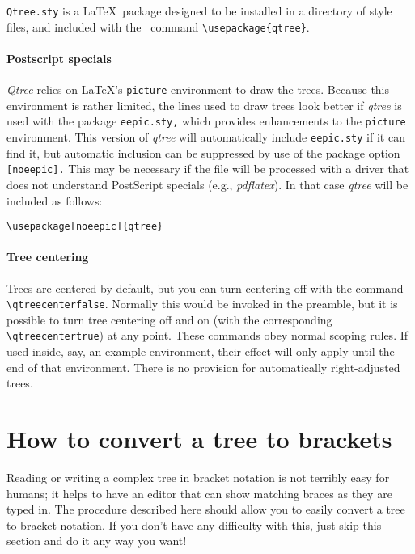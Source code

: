 \documentclass[11pt]{article}
\begin{document}
{\tt Qtree.sty} is a \LaTeX\ package designed to be installed in a
directory of style files, and included with the \LaTeXe\ command 
\verb|\usepackage{qtree}|.

\paragraph{Postscript specials} \emph{Qtree} relies on \LaTeX's {\tt picture}
environment to draw the trees. 
Because this environment is rather limited, the lines used to draw trees look
better if \emph{qtree} is used with the package {\tt eepic.sty,} which
provides enhancements to the {\tt picture} environment.  This version of {\it
qtree\/} will automatically include {\tt eepic.sty\/} if it can find it, but
automatic inclusion can be suppressed by use of the package option {\tt
[noeepic].}  This may be necessary if the file will be processed with a driver
that does not understand PostScript specials (e.g., \emph{pdflatex}).  In that
case \emph{qtree} will be included as follows:

\begin{verbatim}
\usepackage[noeepic]{qtree}
\end{verbatim}

 
\paragraph{Tree centering} Trees are centered by default, but you can turn
centering off with  
the command \verb|\qtreecenterfalse|.  Normally this would be invoked in the
preamble, but it is possible to turn tree centering off and on (with the
corresponding \verb|\qtreecentertrue|) at any point.  These commands obey
normal scoping rules.  If used
inside, say, an example environment, their effect will only apply until the
end of that environment.  There is no provision for automatically
right-adjusted trees. 

\section{How to convert a tree to brackets}

Reading or writing a complex tree in bracket notation is not terribly easy for
humans; it helps to have an editor that can show matching braces as they are
typed in.  The procedure described here should allow you to easily convert a
tree to bracket notation.  If you don't have any difficulty with this, just
skip this section and do it any way you want!
\end{document}
